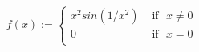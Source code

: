 \documentclass[preview]{standalone}
\begin{document}
\begin{align*}
f(x) := \begin{cases}x^{2}sin(1/x^{2})  &  \text{ if} \ \ \  x \neq 0 \\0 &  \text{ if} \ \ \ x=0 \\\end{cases}
\end{align*}
\end{document}

